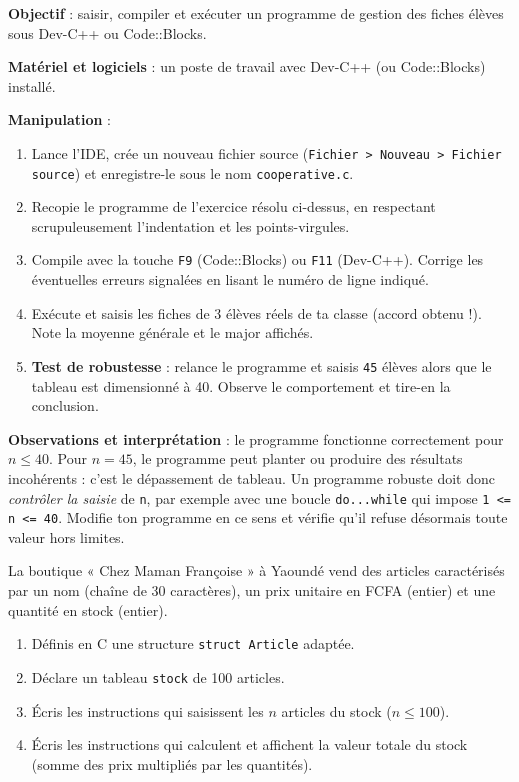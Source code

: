 \documentclass[11pt]{article}
\begin{document}
\begin{experience}
\textbf{Objectif} : saisir, compiler et exécuter un programme de gestion des fiches élèves sous Dev-C++ ou Code::Blocks.

\textbf{Matériel et logiciels} : un poste de travail avec Dev-C++ (ou Code::Blocks) installé.

\textbf{Manipulation} :
\begin{enumerate}
\item Lance l'IDE, crée un nouveau fichier source (\texttt{Fichier > Nouveau > Fichier source}) et enregistre-le sous le nom \texttt{cooperative.c}.
\item Recopie le programme de l'exercice résolu ci-dessus, en respectant scrupuleusement l'indentation et les points-virgules.
\item Compile avec la touche \texttt{F9} (Code::Blocks) ou \texttt{F11} (Dev-C++). Corrige les éventuelles erreurs signalées en lisant le numéro de ligne indiqué.
\item Exécute et saisis les fiches de 3 élèves réels de ta classe (accord obtenu !). Note la moyenne générale et le major affichés.
\item \textbf{Test de robustesse} : relance le programme et saisis \texttt{45} élèves alors que le tableau est dimensionné à 40. Observe le comportement et tire-en la conclusion.
\end{enumerate}

\textbf{Observations et interprétation} : le programme fonctionne correctement pour $n \leq 40$. Pour $n = 45$, le programme peut planter ou produire des résultats incohérents : c'est le dépassement de tableau. Un programme robuste doit donc \emph{contrôler la saisie} de \texttt{n}, par exemple avec une boucle \texttt{do...while} qui impose \texttt{1 <= n <= 40}. Modifie ton programme en ce sens et vérifie qu'il refuse désormais toute valeur hors limites.
\end{experience}

\begin{exercice}
La boutique « Chez Maman Françoise » à Yaoundé vend des articles caractérisés par un nom (chaîne de 30 caractères), un prix unitaire en FCFA (entier) et une quantité en stock (entier).
\begin{enumerate}
\item Définis en C une structure \texttt{struct Article} adaptée.
\item Déclare un tableau \texttt{stock} de 100 articles.
\item Écris les instructions qui saisissent les $n$ articles du stock ($n \leq 100$).
\item Écris les instructions qui calculent et affichent la valeur totale du stock (somme des prix multipliés par les quantités).
\end{enumerate}
\end{exercice}
\end{document}
